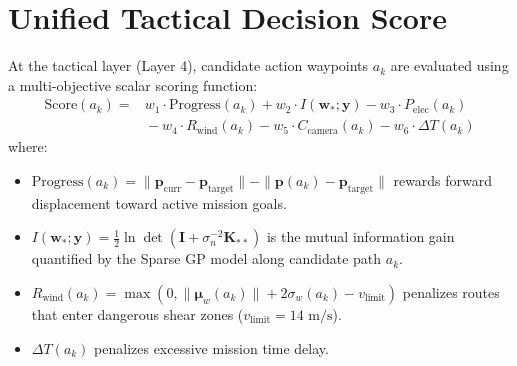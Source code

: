 \documentclass[12pt,a4paper,oneside]{report}
\begin{document}
\section{Unified Tactical Decision Score}
At the tactical layer (Layer 4), candidate action waypoints $a_k$ are evaluated using a multi-objective scalar scoring function:
\begin{equation}
\begin{split}
    \text{Score}(a_k) ={}& w_1 \cdot \text{Progress}(a_k) + w_2 \cdot I(\mathbf{w}_*; \mathbf{y}) - w_3 \cdot P_{\text{elec}}(a_k) \\
    &{}- w_4 \cdot R_{\text{wind}}(a_k) - w_5 \cdot C_{\text{camera}}(a_k) - w_6 \cdot \Delta T(a_k)
\end{split}
\label{eq:decision_score}
\end{equation}
where:
\begin{itemize}
    \item $\text{Progress}(a_k) = \|\mathbf{p}_{\text{curr}} - \mathbf{p}_{\text{target}}\| - \|\mathbf{p}(a_k) - \mathbf{p}_{\text{target}}\|$ rewards forward displacement toward active mission goals.
    \item $I(\mathbf{w}_*; \mathbf{y}) = \frac{1}{2} \ln \det \left( \mathbf{I} + \sigma_n^{-2} \mathbf{K}_{**} \right)$ is the mutual information gain quantified by the Sparse GP model along candidate path $a_k$.
    \item $R_{\text{wind}}(a_k) = \max\left(0, \|\boldsymbol{\mu}_w(a_k)\| + 2 \sigma_w(a_k) - v_{\text{limit}}\right)$ penalizes routes that enter dangerous shear zones ($v_{\text{limit}} = 14\text{ m/s}$).
    \item $\Delta T(a_k)$ penalizes excessive mission time delay.
\end{itemize}
\end{document}
